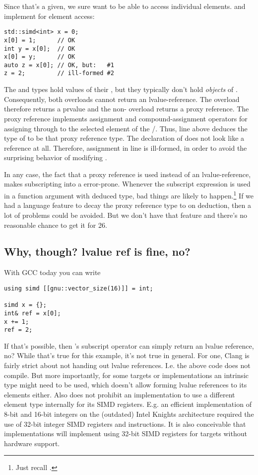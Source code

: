 Since that's a given, we sure want to be able to access individual elements.
\simd and \mask implement  for element access:

\medskip\begin{lstlisting}[style=Vc]
std::simd<int> x = 0;
x[0] = 1;      // OK
int y = x[0];  // OK
x[0] = y;      // OK
auto z = x[0]; // OK, but:   #1
z = 2;         // ill-formed #2
\end{lstlisting}

The \simd and \mask types hold values of their , but they typically
don't hold \emph{objects} of .
Consequently, both  overloads cannot return an
lvalue-reference.
The  overload therefore returns a prvalue and the non-
overload returns a proxy reference.
The proxy reference implements assignment and compound-assignment operators for
assigning through to the selected element of the \simd/\mask.
Thus, line  above deduces the type of  to be that proxy
reference type.
The declaration of  does not look like a reference at all.
Therefore, assignment in line  is ill-formed, in order to avoid
the surprising behavior of modifying .

In any case, the fact that a proxy reference is used instead of an
lvalue-reference, makes subscripting into a  error-prone.
Whenever the subscript expression is used in a function argument with deduced
type, bad things are likely to happen.\footnote{Just recall
.}
If we had a language feature to decay the proxy reference type to  on
deduction, then a lot of problems could be avoided.
But we don't have that feature and there's no reasonable chance to get it for
\CC{}26.

\subsection{Why, though? lvalue ref is fine, no?}

With GCC today you can write
\medskip\begin{lstlisting}[style=Vc]
using simd [[gnu::vector_size(16)]] = int;

simd x = {};
int& ref = x[0];
x += 1;
ref = 2;
\end{lstlisting}
If that's possible, then 's subscript operator can simply
return an lvalue reference, no?
While that's true for this example, it's not true in general.
For one, Clang is fairly strict about not handing out lvalue references.
I.e. the above code does not compile.
But more importantly, for some targets or implementations an intrinsic type
might need to be used, which doesn't allow forming lvalue references to its
elements either.
Also \simd does not prohibit an implementation to use a different element type
internally for its SIMD registers.
E.g. an efficient implementation of 8-bit and 16-bit integers on the (outdated)
Intel Knights architecture required the use of 32-bit integer SIMD registers
and instructions.
It is also conceivable that implementations will implement
 using 32-bit  SIMD registers for
targets without hardware support.

